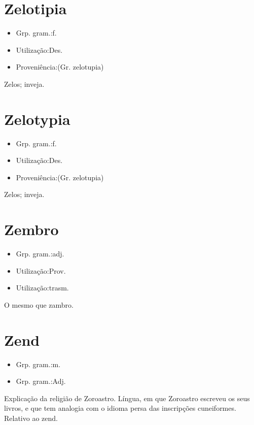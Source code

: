 \section{Zelotipia}
\begin{itemize}
\item {Grp. gram.:f.}
\end{itemize}
\begin{itemize}
\item {Utilização:Des.}
\end{itemize}
\begin{itemize}
\item {Proveniência:(Gr. \textunderscore zelotupia\textunderscore )}
\end{itemize}
Zelos; inveja.
\section{Zelotypia}
\begin{itemize}
\item {Grp. gram.:f.}
\end{itemize}
\begin{itemize}
\item {Utilização:Des.}
\end{itemize}
\begin{itemize}
\item {Proveniência:(Gr. \textunderscore zelotupia\textunderscore )}
\end{itemize}
Zelos; inveja.
\section{Zembro}
\begin{itemize}
\item {Grp. gram.:adj.}
\end{itemize}
\begin{itemize}
\item {Utilização:Prov.}
\end{itemize}
\begin{itemize}
\item {Utilização:trasm.}
\end{itemize}
O mesmo que \textunderscore zambro\textunderscore .
\section{Zend}
\begin{itemize}
\item {Grp. gram.:m.}
\end{itemize}
\begin{itemize}
\item {Grp. gram.:Adj.}
\end{itemize}
Explicação da religião de Zoroastro.
Língua, em que Zoroastro escreveu os seus livros, e que tem analogia com o idioma persa das inscripções cuneiformes.
Relativo ao zend.
